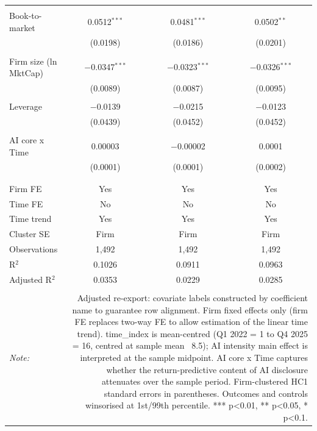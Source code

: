 \begin{table}[!htbp]
\begin{tabular}{@{\extracolsep{5pt}}lccc}
  & & & \\ 
 Book-to-market & 0.0512$^{***}$ & 0.0481$^{***}$ & 0.0502$^{**}$ \\ 
  & (0.0198) & (0.0186) & (0.0201) \\ 
  & & & \\ 
 Firm size (ln MktCap) & $-$0.0347$^{***}$ & $-$0.0323$^{***}$ & $-$0.0326$^{***}$ \\ 
  & (0.0089) & (0.0087) & (0.0095) \\ 
  & & & \\ 
 Leverage & $-$0.0139 & $-$0.0215 & $-$0.0123 \\ 
  & (0.0439) & (0.0452) & (0.0452) \\ 
  & & & \\ 
 AI core x Time & 0.00003 & $-$0.00002 & 0.0001 \\ 
  & (0.0001) & (0.0001) & (0.0002) \\ 
  & & & \\ 
\hline \\[-1.8ex] 
Firm FE & Yes & Yes & Yes \\ 
Time FE & No & No & No \\ 
Time trend & Yes & Yes & Yes \\ 
Cluster SE & Firm & Firm & Firm \\ 
Observations & 1,492 & 1,492 & 1,492 \\ 
R$^{2}$ & 0.1026 & 0.0911 & 0.0963 \\ 
Adjusted R$^{2}$ & 0.0353 & 0.0229 & 0.0285 \\ 
\hline 
\hline \\[-1.8ex] 
\textit{Note:}  & \multicolumn{3}{r}{Adjusted re-export: covariate labels constructed by coefficient name to guarantee row alignment. Firm fixed effects only (firm FE replaces two-way FE to allow estimation of the linear time trend). time_index is mean-centred (Q1 2022 = 1 to Q4 2025 = 16, centred at sample mean ~8.5); AI intensity main effect is interpreted at the sample midpoint. AI core x Time captures whether the return-predictive content of AI disclosure attenuates over the sample period. Firm-clustered HC1 standard errors in parentheses. Outcomes and controls winsorised at 1st/99th percentile. *** p<0.01, ** p<0.05, * p<0.1.} \\ 
\end{tabular} 
\end{table} 
